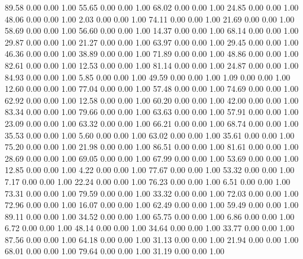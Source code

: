    89.58   0.00   0.00   1.00
   55.65   0.00   0.00   1.00
   68.02   0.00   0.00   1.00
   24.85   0.00   0.00   1.00
   48.06   0.00   0.00   1.00
    2.03   0.00   0.00   1.00
   74.11   0.00   0.00   1.00
   21.69   0.00   0.00   1.00
   58.69   0.00   0.00   1.00
   56.60   0.00   0.00   1.00
   14.37   0.00   0.00   1.00
   68.14   0.00   0.00   1.00
   29.87   0.00   0.00   1.00
   21.27   0.00   0.00   1.00
   63.97   0.00   0.00   1.00
   29.45   0.00   0.00   1.00
   46.36   0.00   0.00   1.00
   38.89   0.00   0.00   1.00
   71.89   0.00   0.00   1.00
   48.86   0.00   0.00   1.00
   82.61   0.00   0.00   1.00
   12.53   0.00   0.00   1.00
   81.14   0.00   0.00   1.00
   24.87   0.00   0.00   1.00
   84.93   0.00   0.00   1.00
    5.85   0.00   0.00   1.00
   49.59   0.00   0.00   1.00
    1.09   0.00   0.00   1.00
   12.60   0.00   0.00   1.00
   77.04   0.00   0.00   1.00
   57.48   0.00   0.00   1.00
   74.69   0.00   0.00   1.00
   62.92   0.00   0.00   1.00
   12.58   0.00   0.00   1.00
   60.20   0.00   0.00   1.00
   42.00   0.00   0.00   1.00
   83.34   0.00   0.00   1.00
   79.66   0.00   0.00   1.00
   63.63   0.00   0.00   1.00
   57.91   0.00   0.00   1.00
   23.09   0.00   0.00   1.00
   63.32   0.00   0.00   1.00
   66.21   0.00   0.00   1.00
   68.74   0.00   0.00   1.00
   35.53   0.00   0.00   1.00
    5.60   0.00   0.00   1.00
   63.02   0.00   0.00   1.00
   35.61   0.00   0.00   1.00
   75.20   0.00   0.00   1.00
   21.98   0.00   0.00   1.00
   86.51   0.00   0.00   1.00
   81.61   0.00   0.00   1.00
   28.69   0.00   0.00   1.00
   69.05   0.00   0.00   1.00
   67.99   0.00   0.00   1.00
   53.69   0.00   0.00   1.00
   12.85   0.00   0.00   1.00
    4.22   0.00   0.00   1.00
   77.67   0.00   0.00   1.00
   53.32   0.00   0.00   1.00
    7.17   0.00   0.00   1.00
   22.24   0.00   0.00   1.00
   76.23   0.00   0.00   1.00
    6.51   0.00   0.00   1.00
   73.31   0.00   0.00   1.00
   79.59   0.00   0.00   1.00
   33.32   0.00   0.00   1.00
   72.03   0.00   0.00   1.00
   72.96   0.00   0.00   1.00
   16.07   0.00   0.00   1.00
   62.49   0.00   0.00   1.00
   59.49   0.00   0.00   1.00
   89.11   0.00   0.00   1.00
   34.52   0.00   0.00   1.00
   65.75   0.00   0.00   1.00
    6.86   0.00   0.00   1.00
    6.72   0.00   0.00   1.00
   48.14   0.00   0.00   1.00
   34.64   0.00   0.00   1.00
   33.77   0.00   0.00   1.00
   87.56   0.00   0.00   1.00
   64.18   0.00   0.00   1.00
   31.13   0.00   0.00   1.00
   21.94   0.00   0.00   1.00
   68.01   0.00   0.00   1.00
   79.64   0.00   0.00   1.00
   31.19   0.00   0.00   1.00
